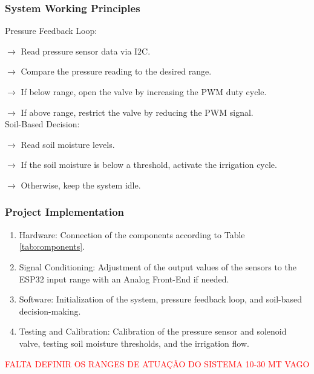 \pagebreak

\subsubsection{System Working Principles}

Pressure Feedback Loop:

$\rightarrow$ Read pressure sensor data via I2C.

$\rightarrow$ Compare the pressure reading to the desired range.

$\rightarrow$ If below range, open the valve by increasing the PWM duty cycle.

$\rightarrow$ If above range, restrict the valve by reducing the PWM signal.
\\

Soil-Based Decision:

$\rightarrow$ Read soil moisture levels.

$\rightarrow$ If the soil moisture is below a threshold, activate the irrigation cycle.

$\rightarrow$ Otherwise, keep the system idle.


\subsubsection{Project Implementation}
\begin{enumerate}
    \item Hardware: Connection of the components according to Table \ref{tab:components}. 
    \item Signal Conditioning: Adjustment of the output values of the sensors to the ESP32 input range with an Analog Front-End if needed.
    \item  Software: Initialization of the system, pressure feedback loop, and soil-based decision-making.
    \item Testing and Calibration: Calibration of the pressure sensor and solenoid valve, testing soil moisture thresholds, and the irrigation flow.
\end{enumerate}

\textcolor{red}{FALTA DEFINIR OS RANGES DE ATUAÇÃO DO SISTEMA 10-30 MT VAGO}



